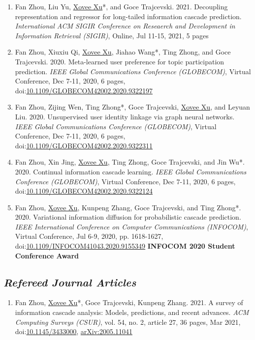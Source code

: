 \begin{enumerate}
    \item Fan Zhou, Liu Yu, \underline{Xovee Xu}*, and Goce Trajcevski. 2021. Decoupling representation and regressor for long-tailed information cascade prediction. \textit{International ACM SIGIR Conference on Reseaerch and Development in Information Retrieval (SIGIR)}, Online, Jul 11-15, 2021, 5 pages
    \item Fan Zhou, Xiuxiu Qi, \underline{Xovee Xu}, Jiahao Wang*, Ting Zhong, and Goce Trajcevski. 2020. Meta-learned user preference for topic participation prediction. \textit{IEEE Global Communications Conference (GLOBECOM)}, Virtual Conference, Dec 7-11, 2020, 6 pages, doi:\href{https://doi.org/10.1109/GLOBECOM42002.2020.9322197}{10.1109/GLOBECOM42002.2020.9322197}
    \item Fan Zhou, Zijing Wen, Ting Zhong*, Goce Trajcevski, \underline{Xovee Xu}, and Leyuan Liu. 2020. Unsupervised user identity linkage via graph neural networks. \textit{IEEE Global Communications Conference (GLOBECOM)}, Virtual Conference, Dec 7-11, 2020, 6 pages, doi:\href{https://doi.org/10.1109/GLOBECOM42002.2020.9322311}{10.1109/GLOBECOM42002.2020.9322311}
    \item Fan Zhou, Xin Jing, \underline{Xovee Xu}, Ting Zhong, Goce Trajcevski, and Jin Wu*. 2020. Continual information cascade learning. \textit{IEEE Global Communications Conference (GLOBECOM)}, Virtual Conference, Dec 7-11, 2020, 6 pages, doi:\href{https://doi.org/10.1109/GLOBECOM42002.2020.9322124}{10.1109/GLOBECOM42002.2020.9322124}
    \item Fan Zhou, \underline{Xovee Xu}, Kunpeng Zhang, Goce Trajcevski, and Ting Zhong*. 2020. Variational information diffusion for probabilistic cascade prediction. \textit{IEEE International Conference on Computer Communications (INFOCOM)}, Virtual Conference, Jul 6-9, 2020, pp. 1618-1627, doi:\href{https://doi.org/10.1109/INFOCOM41043.2020.9155349}{10.1109/INFOCOM41043.2020.9155349}
    \newline \textbf{\color{red}INFOCOM 2020 Student Conference Award}
\end{enumerate}

\subsection*{\textnormal{\textit{Refereed Journal Articles}}}

\begin{enumerate}[resume]
    \item Fan Zhou, \underline{Xovee Xu}*, Goce Trajcevski, Kunpeng Zhang. 2021. A survey of information cascade analysis: Models, predictions, and recent advances. \textit{ACM Computing Surveys (CSUR)}, vol. 54, no. 2, article 27, 36 pages, Mar 2021, doi:\href{https://xovee.cn/html/paper-redirects/csur2021.html}{10.1145/3433000}, \href{https://arxiv.org/abs/2005.11041}{arXiv:2005.11041}
\end{enumerate}

